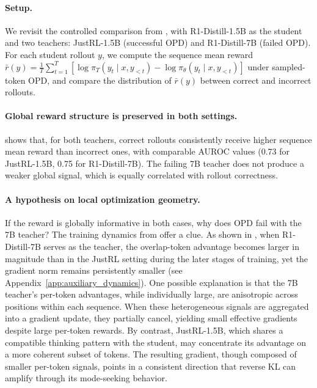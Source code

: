 \paragraph{Setup.}
We revisit the controlled comparison from , with R1-Distill-1.5B as the student and two teachers: JustRL-1.5B (successful OPD) and R1-Distill-7B (failed OPD). For each student rollout $y$, we compute the sequence mean reward
$\bar{r}(y) = \frac{1}{T}\sum_{t=1}^{T} \left[\log \pi_{T}(y_t \mid x, y_{<t}) - \log \pi_\theta(y_t \mid x, y_{<t})\right]$
under sampled-token OPD, and compare the distribution of $\bar{r}(y)$ between correct and incorrect rollouts.

\paragraph{Global reward structure is preserved in both settings.}
 shows that, for both teachers, correct rollouts consistently receive higher sequence mean reward than incorrect ones, with comparable AUROC values (0.73 for JustRL-1.5B, 0.75 for R1-Distill-7B). The failing 7B teacher does not produce a weaker global signal, which is equally correlated with rollout correctness.

\paragraph{A hypothesis on local optimization geometry.}
If the reward is globally informative in both cases, why does OPD fail with the 7B teacher? The training dynamics from  offer a clue. As shown in , when R1-Distill-7B serves as the teacher, the overlap-token advantage becomes larger in magnitude than in the JustRL setting during the later stages of training, yet the gradient norm remains persistently smaller (see Appendix~\ref{app:auxiliary_dynamics}). One possible explanation is that the 7B teacher's per-token advantages, while individually large, are anisotropic across positions within each sequence. When these heterogeneous signals are aggregated into a gradient update, they partially cancel, yielding small effective gradients despite large per-token rewards. By contrast, JustRL-1.5B, which shares a compatible thinking pattern with the student, may concentrate its advantage on a more coherent subset of tokens. The resulting gradient, though composed of smaller per-token signals, points in a consistent direction that reverse KL can amplify through its mode-seeking behavior.

